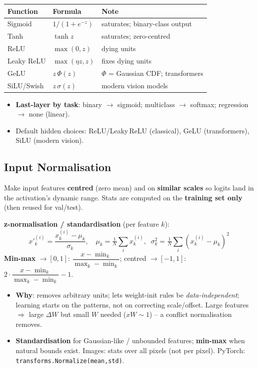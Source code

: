 \documentclass[10pt,a4paper]{article}
\begin{document}
	\begin{center}\footnotesize
	\begin{tabular}{@{}lll@{}}
		\toprule
		Function & Formula & Note \\
		\midrule
		Sigmoid    & $1/(1+e^{-z})$ & saturates; binary-class output \\
		Tanh       & $\tanh z$ & saturates; zero-centred \\
		ReLU       & $\max(0,z)$ & dying units \\
		Leaky ReLU & $\max(\eta z,z)$ & fixes dying units \\
		GeLU       & $z\,\Phi(z)$ & $\Phi$ = Gaussian CDF; transformers \\
		SiLU/Swish & $z\,\sigma(z)$ & modern vision models \\
		\bottomrule
	\end{tabular}
	\end{center}
	\begin{itemize}[leftmargin=*]
		\item \textbf{Last-layer by task}: binary $\rightarrow$ sigmoid; multiclass $\rightarrow$ softmax; regression $\rightarrow$ none (linear).
		\item Default hidden choices: ReLU/Leaky\,ReLU (classical), GeLU (transformers), SiLU (modern vision).
	\end{itemize}

	\subsection{Input Normalisation}

	\begin{definitionbox}
		Make input features \textbf{centred} (zero mean) and on \textbf{similar scales} so logits land in the activation's dynamic range. Stats are computed on the \textbf{training set only} (then reused for val/test).
	\end{definitionbox}

	\begin{formulabox}
		\textbf{z-normalisation / standardisation} (per feature $k$):
		\[
		x'^{(i)}_k = \frac{x^{(i)}_k - \mu_k}{\sigma_k}, \quad
		\mu_k=\tfrac1N\textstyle\sum_i x_k^{(i)},\;\;
		\sigma_k^2=\tfrac1N\textstyle\sum_i (x_k^{(i)}-\mu_k)^2
		\]
		\textbf{Min-max} $\rightarrow[0,1]$: $\dfrac{x-\min_k}{\max_k-\min_k}$; \quad centred $\rightarrow[-1,1]$: $2\cdot\dfrac{x-\min_k}{\max_k-\min_k}-1$.
	\end{formulabox}
	\begin{itemize}[leftmargin=*]
		\item \textbf{Why}: removes arbitrary units; lets weight-init rules be \emph{data-independent}; learning starts on the patterns, not on correcting scale/offset. Large features $\Rightarrow$ large $\Delta W$ but small $W$ needed ($xW\!\sim\!1$) -- a conflict normalisation removes.
		\item \textbf{Standardisation} for Gaussian-like / unbounded features; \textbf{min-max} when natural bounds exist. Images: stats over all pixels (not per pixel). PyTorch: \texttt{transforms.Normalize(mean,std)}.
	\end{itemize}
\end{document}

